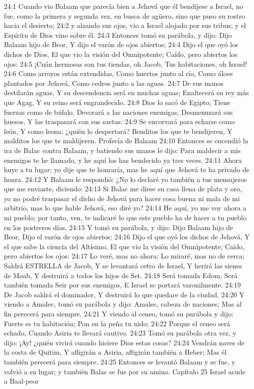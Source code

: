 24:1 Cuando vio Balaam que parecía bien a Jehová que él bendijese a Israel, no fue, como la primera y segunda vez, en busca de agüero, sino que puso su rostro hacia el desierto;  
24:2 y alzando sus ojos, vio a Israel alojado por sus tribus; y el Espíritu de Dios vino sobre él.  
24:3 Entonces tomó su parábola, y dijo:  
Dijo Balaam hijo de Beor,  
Y dijo el varón de ojos abiertos;  
24:4 Dijo el que oyó los dichos de Dios,  
El que vio la visión del Omnipotente;  
Caído, pero abiertos los ojos:  
24:5 ¡Cuán hermosas son tus tiendas, oh Jacob,  
Tus habitaciones, oh Israel! 
24:6 Como arroyos están extendidas,  
Como huertos junto al río,  
Como áloes plantados por Jehová,  
Como cedros junto a las aguas.  
24:7 De sus manos destilarán aguas,  
Y su descendencia será en muchas aguas;  
Enaltecerá su rey más que Agag,  
Y su reino será engrandecido. 
24:8 Dios lo sacó de Egipto;  
Tiene fuerzas como de búfalo.  
Devorará a las naciones enemigas,  
Desmenuzará sus huesos, 
Y las traspasará con sus saetas.  
24:9 Se encorvará para echarse como león,  
Y como leona; ¿quién lo despertará?  
Benditos los que te bendijeren,  
Y malditos los que te maldijeren.  
Profecía de Balaam  
24:10 Entonces se encendió la ira de Balac contra Balaam, y batiendo sus manos le dijo: Para maldecir a mis enemigos te he llamado, y he aquí los has bendecido ya tres veces.  
24:11 Ahora huye a tu lugar; yo dije que te honraría, mas he aquí que Jehová te ha privado de honra.  
24:12 Y Balaam le respondió: ¿No lo declaré yo también a tus mensajeros que me enviaste, diciendo:  
24:13 Si Balac me diese su casa llena de plata y oro, yo no podré traspasar el dicho de Jehová para hacer cosa buena ni mala de mi arbitrio, mas lo que hable Jehová, eso diré yo?  
24:14 He aquí, yo me voy ahora a mi pueblo; por tanto, ven, te indicaré lo que este pueblo ha de hacer a tu pueblo en los postreros días.  
24:15 Y tomó su parábola, y dijo:  
Dijo Balaam hijo de Beor,  
Dijo el varón de ojos abiertos;  
24:16 Dijo el que oyó los dichos de Jehová,  
Y el que sabe la ciencia del Altísimo,  
El que vio la visión del Omnipotente;  
Caído, pero abiertos los ojos:  
24:17 Lo veré, mas no ahora;  
Lo miraré, mas no de cerca;  
Saldrá ESTRELLA de Jacob,  
Y se levantará cetro de Israel,  
Y herirá las sienes de Moab,  
Y destruirá a todos los hijos de Set.  
24:18 Será tomada Edom,  
Será también tomada Seir por sus enemigos,  
E Israel se portará varonilmente.  
24:19 De Jacob saldrá el dominador,  
Y destruirá lo que quedare de la ciudad.  
24:20 Y viendo a Amalec, tomó su parábola y dijo: 
Amalec, cabeza de naciones; 
Mas al fin perecerá para siempre. 
24:21 Y viendo al ceneo, tomó su parábola y dijo: 
Fuerte es tu habitación; 
Pon en la peña tu nido; 
24:22 Porque el ceneo será echado, 
Cuando Asiria te llevará cautivo. 
24:23 Tomó su parábola otra vez, y dijo: 
¡Ay! ¿quién vivirá cuando hiciere Dios estas cosas? 
24:24 Vendrán naves de la costa de Quitim, 
Y afligirán a Asiria, afligirán también a Heber; 
Mas él también perecerá para siempre. 
24:25 Entonces se levantó Balaam y se fue, 
y volvió a su lugar; y también Balac se fue por su amino.  
Capítulo 25
Israel acude a Baal-peor 

